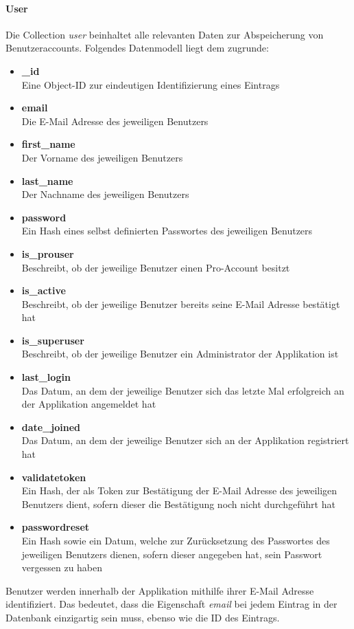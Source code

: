 \paragraph{User}
Die Collection \textit{user} beinhaltet alle relevanten Daten zur Abspeicherung von Benutzeraccounts. Folgendes Datenmodell liegt dem zugrunde:
\begin{itemize}
\item \textbf{\_id}\\ Eine Object-ID zur eindeutigen Identifizierung eines Eintrags
\item \textbf{email}\\ Die E-Mail Adresse des jeweiligen Benutzers
\item \textbf{first\_name}\\ Der Vorname des jeweiligen Benutzers
\item \textbf{last\_name}\\ Der Nachname des jeweiligen Benutzers
\item \textbf{password}\\ Ein Hash eines selbst definierten Passwortes des jeweiligen Benutzers
\item \textbf{is\_prouser}\\ Beschreibt, ob der jeweilige Benutzer einen Pro-Account besitzt
\item \textbf{is\_active}\\ Beschreibt, ob der jeweilige Benutzer bereits seine E-Mail Adresse bestätigt hat
\item \textbf{is\_superuser}\\ Beschreibt, ob der jeweilige Benutzer ein Administrator der Applikation ist
\item \textbf{last\_login}\\ Das Datum, an dem der jeweilige Benutzer sich das letzte Mal erfolgreich an der Applikation angemeldet hat
\item \textbf{date\_joined}\\ Das Datum, an dem der jeweilige Benutzer sich an der Applikation registriert hat
\item \textbf{validatetoken}\\ Ein Hash, der als Token zur Bestätigung der E-Mail Adresse des jeweiligen Benutzers dient, sofern dieser die Bestätigung noch nicht durchgeführt hat
\item \textbf{passwordreset}\\ Ein Hash sowie ein Datum, welche zur Zurücksetzung des Passwortes des jeweiligen Benutzers dienen, sofern dieser angegeben hat, sein Passwort vergessen zu haben
\end{itemize}
Benutzer werden innerhalb der Applikation mithilfe ihrer E-Mail Adresse identifiziert. Das bedeutet, dass die Eigenschaft \textit{email} bei jedem Eintrag in der Datenbank einzigartig sein muss, ebenso wie die ID des Eintrags.

